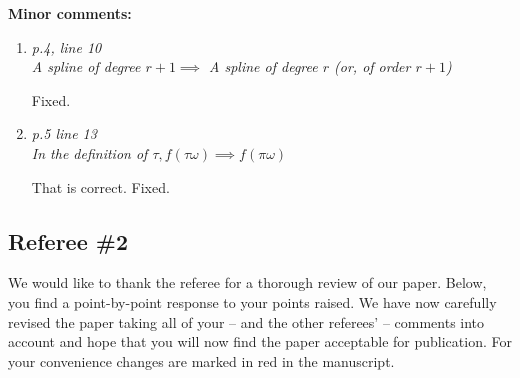 \documentclass{scrartcl}
\newcommand{\refereeQuote}{\textit }
\newcommand{\response}{}
\begin{document}
\textbf{Minor comments:}
\begin{enumerate}
\item
\refereeQuote{p.4, line 10\\
A spline of degree $r+1\implies$ A spline of degree $r$ (or, of order $r+1$)}\smallskip

\response{Fixed.}\bigskip

\item
\refereeQuote{p.5 line 13\\
In the definition of $\tau, f(\tau \omega)\implies f(\pi \omega)$}\smallskip

\response{That is correct.  Fixed. }\bigskip

\end{enumerate}


\subsection*{Referee \#2}


\response{We would like to thank the referee for a thorough review of our paper. Below, you find a point-by-point response to your points raised. We have now carefully revised the paper taking all of your -- and the other referees' -- comments into account and hope that you will now find the paper acceptable for publication. For your convenience changes are marked in red in the manuscript.
} \smallskip
\end{document}
